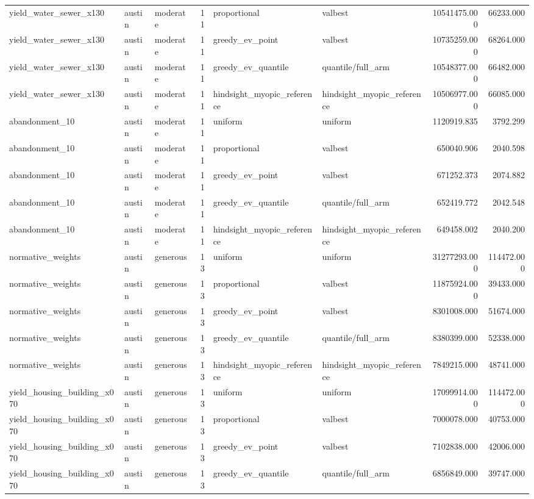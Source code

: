 \begin{tabular}{lllrllrr}
yield\_water\_sewer\_x130 & austin & moderate & 11 & proportional & valbest & 10541475.000 & 66233.000 \\
yield\_water\_sewer\_x130 & austin & moderate & 11 & greedy\_ev\_point & valbest & 10735259.000 & 68264.000 \\
yield\_water\_sewer\_x130 & austin & moderate & 11 & greedy\_ev\_quantile & quantile/full\_arm & 10548377.000 & 66482.000 \\
yield\_water\_sewer\_x130 & austin & moderate & 11 & hindsight\_myopic\_reference & hindsight\_myopic\_reference & 10506977.000 & 66085.000 \\
abandonment\_10 & austin & moderate & 11 & uniform & uniform & 1120919.835 & 3792.299 \\
abandonment\_10 & austin & moderate & 11 & proportional & valbest & 650040.906 & 2040.598 \\
abandonment\_10 & austin & moderate & 11 & greedy\_ev\_point & valbest & 671252.373 & 2074.882 \\
abandonment\_10 & austin & moderate & 11 & greedy\_ev\_quantile & quantile/full\_arm & 652419.772 & 2042.548 \\
abandonment\_10 & austin & moderate & 11 & hindsight\_myopic\_reference & hindsight\_myopic\_reference & 649458.002 & 2040.200 \\
normative\_weights & austin & generous & 13 & uniform & uniform & 31277293.000 & 114472.000 \\
normative\_weights & austin & generous & 13 & proportional & valbest & 11875924.000 & 39433.000 \\
normative\_weights & austin & generous & 13 & greedy\_ev\_point & valbest & 8301008.000 & 51674.000 \\
normative\_weights & austin & generous & 13 & greedy\_ev\_quantile & quantile/full\_arm & 8380399.000 & 52338.000 \\
normative\_weights & austin & generous & 13 & hindsight\_myopic\_reference & hindsight\_myopic\_reference & 7849215.000 & 48741.000 \\
yield\_housing\_building\_x070 & austin & generous & 13 & uniform & uniform & 17099914.000 & 114472.000 \\
yield\_housing\_building\_x070 & austin & generous & 13 & proportional & valbest & 7000078.000 & 40753.000 \\
yield\_housing\_building\_x070 & austin & generous & 13 & greedy\_ev\_point & valbest & 7102838.000 & 42006.000 \\
yield\_housing\_building\_x070 & austin & generous & 13 & greedy\_ev\_quantile & quantile/full\_arm & 6856849.000 & 39747.000 \\

\end{tabular}
